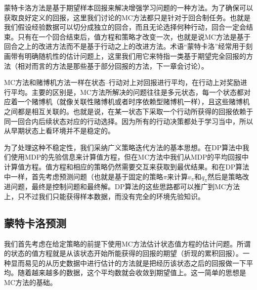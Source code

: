\documentclass{ctexart}
\begin{document}
        蒙特卡洛方法是基于期望样本回报来解决增强学习问题的一种方法。为了确保可以获取良好定义的回报，这里我们讨论的MC方法都只是针对于回合制任务。也就是我们假设经验数据可以切分成独立的回合，而且无论选择何种行动，回合一定会结束。只有在一个回合结束后，值方程和策略才改变一次，也就是说MC方法是基于回合之上的改进方法而不是基于行动之上的改进方法。术语“蒙特卡洛”经常用于刻画带有明确随机性的估计问题上，这里我们用它来特指一类基于期望完全回报的方法（相对而言的方法是那些基于部分回报的方法，下一章会讨论）。
        
        MC方法和赌博机方法一样在状态--行动对上对回报进行平均，在行动上对奖励进行平均。主要的区别是，MC方法所解决的问题往往是多元状态，每一个状态都对应着一个赌博机（就像关联性赌博机或者时序依赖型赌博机一样），且这些赌博机之间都是相互关联的。也就是说，在某一状态下采取一个行动所获得的回报依赖于同一回合内后续状态对应的行动选择。因为所有的行动决策都处于学习当中，所以从早期状态上看环境并不是稳定的。
        
        为了处理这种不稳定性，我们采纳广义策略迭代方法的基本思想。在DP算法中我们使用MDP的先验信息来计算值方程，但在MC方法中我们从MDP的平均回报中计算值方程。值方程和相应的策略仍然需要交互来获取到最优结果。和在DP算法中一样，首先考虑预测问题（也就是基于固定的策略$\pi$来计算$v_{\pi}$和$q_{\pi}$然后是策略改进问题，最终是控制问题和最终解。DP算法的这些思路都可以推广到MC方法上，只不过我们只能获得样本数据，而没有完全的环境先验知识。
        
        \subsection{蒙特卡洛预测}
            我们首先考虑在给定策略的前提下使用MC方法估计状态值方程的估计问题。所谓的状态的值方程就是从该状态开始所能获得的回报的期望（折现的累积回报）。一种显而易见的从历史数据中进行估计的方法就是把经历该状态之后的回报做一下平均。随着越来越多的数据，这个平均数就会收敛到期望值上。这一简单的思想是MC方法的基础。
            
\end{document}
